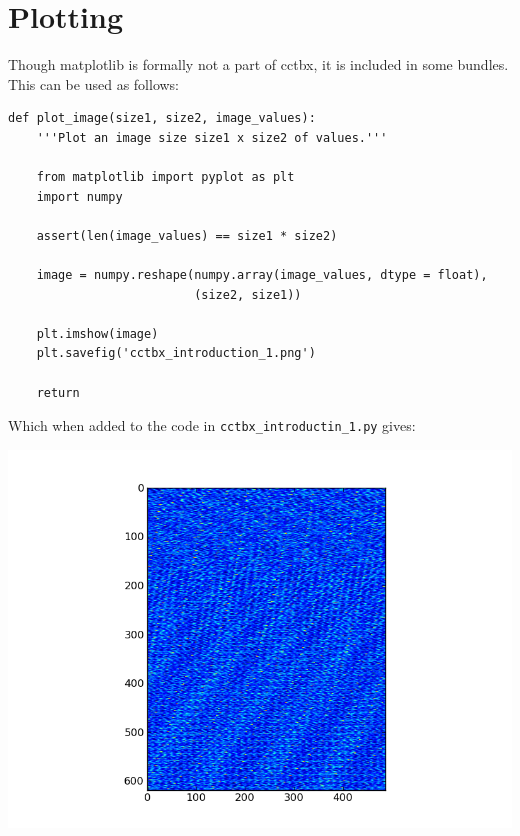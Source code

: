 \documentclass[a4paper, 11pt]{article}
\begin{document}
\section{Plotting}

Though matplotlib is formally not a part of cctbx, it is included in some bundles. This can be used as follows:

{\small
\begin{verbatim}
def plot_image(size1, size2, image_values):
    '''Plot an image size size1 x size2 of values.'''

    from matplotlib import pyplot as plt
    import numpy

    assert(len(image_values) == size1 * size2)

    image = numpy.reshape(numpy.array(image_values, dtype = float),
                          (size2, size1))

    plt.imshow(image)
    plt.savefig('cctbx_introduction_1.png')

    return
\end{verbatim}
}

\noindent
Which when added to the code in \verb|cctbx_introductin_1.py| gives:

\includegraphics[scale = 0.5]{cctbx_introduction_1.png}
\end{document}
